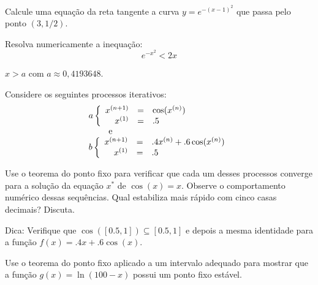 \begin{Exercise} Calcule uma equação da reta tangente a curva $y=e^{-(x-1)^2}$ que passa pelo ponto $(3, 1/2)$.
\end{Exercise}

\begin{Exercise} Resolva numericamente a inequação:
  \begin{equation*}
    e^{-x^2}<2x  
  \end{equation*}
\end{Exercise}
\begin{Answer}
  \begin{tiny}
    $x>a$ com $a\approx 0,4193648$.    
  \end{tiny}
\end{Answer}

\begin{Exercise} Considere os seguintes processos iterativos:
\begin{equation}
\begin{array}{l}
a\left\{\begin{array}{rcl}
x^{(n+1)}&=&\cos(x^{(n)})\\
x^{(1)}&=&.5
\end{array}
\right. \\ \qquad \hbox { e }\\
b\left\{\begin{array}{rcl}
x^{(n+1)}&=&.4x^{(n)}+.6\cos(x^{(n)})\\
x^{(1)}&=&.5
\end{array}
\right.
\end{array}
\end{equation}

Use o teorema do ponto fixo para verificar que cada um desses processos converge para a solução da equação $x^*$ de $\cos(x)=x$. Observe o comportamento numérico dessas sequências. Qual estabiliza mais rápido com cinco casas decimais? Discuta.

Dica: Verifique que $\cos([0.5,1])\subseteq [0.5,1]$ e depois a mesma identidade para a função $f(x)=.4x+.6\cos(x)$.
\end{Exercise}


\begin{Exercise}  Use o teorema do ponto fixo aplicado a um intervalo adequado para mostrar que a função $g(x)=\ln (100-x)$ possui um ponto fixo estável.
\end{Exercise}

